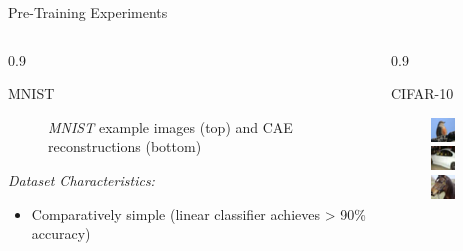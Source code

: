 \documentclass[final]{beamer}
\newlength{\onecolwid}
\newlength{\threecolwid}
\begin{document}
\begin{frame}[t]
\begin{columns}[t]
\begin{column}{\threecolwid}
\begin{alertblock}{Pre-Training Experiments}
\begin{columns}[t, totalwidth=0.9\threecolwid]
\begin{column}{0.9\onecolwid}
\begin{block}{MNIST}
\begin{figure}
	\caption{\emph{MNIST} example images (top) and CAE reconstructions (bottom)}

	\end{figure}

	\emph{Dataset Characteristics:}

	\begin{itemize}
		\item Comparatively simple (linear classifier achieves > 90\% accuracy)
	\end{itemize}

	\end{block}
	\end{column}

	\begin{column}{0.9\onecolwid}
	\begin{block}{CIFAR-10}
	\begin{figure}
	\centering
	\includegraphics[width=0.2\linewidth]{graphics/reconstructions/cifar/input_00.png}
	\includegraphics[width=0.2\linewidth]{graphics/reconstructions/cifar/input_01.png}
	\includegraphics[width=0.2\linewidth]{graphics/reconstructions/cifar/input_02.png}


\end{figure}
\end{block}
\end{column}
\end{columns}
\end{alertblock}
\end{column}
\end{columns}
\end{frame}
\end{document}
